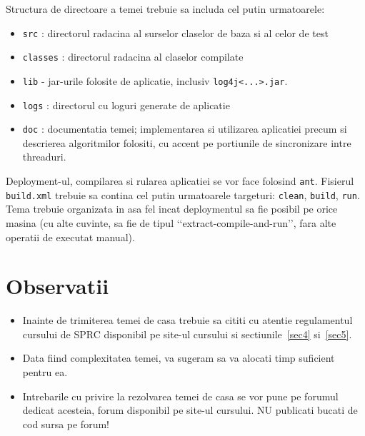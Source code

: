 \documentclass[a4paper]{article}
\begin{document}
\par Structura de directoare a temei trebuie sa includa cel putin urmatoarele:

\begin{itemize}[noitemsep]
	\item \texttt{src} : directorul radacina al surselor claselor de baza si al celor de test
	\item \texttt{classes} : directorul radacina al claselor compilate
	\item \texttt{lib} - jar-urile folosite de aplicatie, inclusiv \texttt{log4j<...>.jar}.
	\item \texttt{logs} : directorul cu loguri generate de aplicatie
	\item \texttt{doc} : documentatia temei; implementarea si utilizarea aplicatiei precum si descrierea algoritmilor folositi, cu accent pe portiunile de sincronizare intre threaduri.
\end{itemize}

\par Deployment-ul, compilarea si rularea aplicatiei se vor face folosind \texttt{ant}. Fisierul \texttt{build.xml} trebuie sa contina cel putin urmatoarele targeturi: \texttt{clean}, \texttt{build}, \texttt{run}. Tema trebuie organizata in asa fel incat deploymentul sa fie posibil pe orice masina (cu alte cuvinte, sa fie de tipul \lq\lq{}extract-compile-and-run\rq\rq{}, fara alte operatii de executat manual).

\section{Observatii}
\label{sec6}

\begin{itemize}
	\item Inainte de trimiterea temei de casa trebuie sa cititi cu atentie regulamentul cursului de SPRC disponibil pe site-ul cursului si sectiunile~\ref{sec4} si~\ref{sec5}.
	\item Data fiind complexitatea temei, va sugeram sa va alocati timp suficient pentru ea.
	\item Intrebarile cu privire la rezolvarea temei de casa se vor pune pe forumul dedicat acesteia, forum disponibil pe site-ul cursului. NU publicati bucati de cod sursa pe forum!
\end{itemize}
\end{document}
